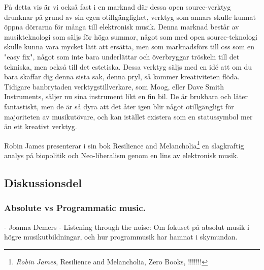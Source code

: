 \documentclass{article}
\begin{document}
  På detta vis är vi också fast i en marknad där dessa open source-verktyg drunknar på grund av sin egen
  otillgänglighet, verktyg som annars skulle kunnat öppna dörrarna för många till elektronisk musik. Denna
  marknad består av musikteknologi som säljs för höga summor, något som med open source-teknologi skulle kunna
  vara mycket lätt att ersätta, men som marknadsförs till oss som en "easy fix", något som inte bara
  underlättar och överbryggar tröskeln till det tekniska, men också till det estetiska. Dessa verktyg
  säljs med en idé att om du bara skaffar dig denna sista sak, denna pryl, så kommer kreativiteten flöda.
  Tidigare banbrytaden verktygstillverkare, som Moog, eller Dave Smith Instruments, säljer nu sina instrument
  likt en fin bil. De är brukbara och låter fantastiskt, men de är så dyra att det åter igen blir något
  otillgängligt för majoriteten av musikutövare, och kan istället existera som en statussymbol mer än ett
  kreativt verktyg. 





  Robin James presenterar i sin bok Resilience and Melancholia\footnote{\emph{Robin James}, Resilience and
  Melancholia, Zero Books, !!!!!!!} en slagkraftig analys på biopolitik och Neo-liberalism genom en lins av 
  elektronisk musik. 



\subsection{Diskussionsdel}
\subsubsection{Absolute vs Programmatic music.}
- Joanna Demers - Listening through the noise: Om fokuset på absolut musik i högre
  musikutbildningar, och hur programmusik har hamnat i skymundan.
\end{document}
